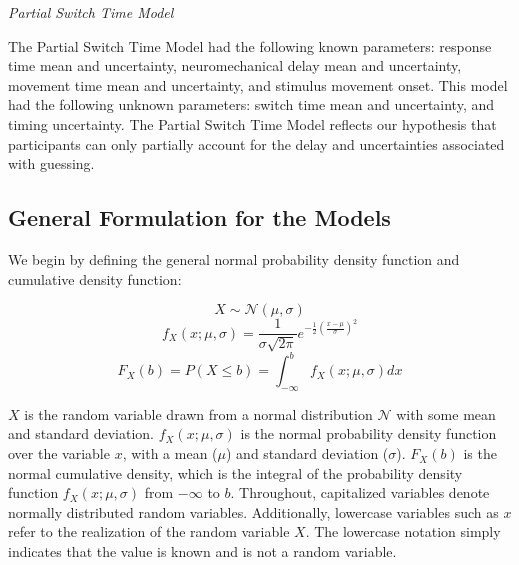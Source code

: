 \documentclass[12pt]{article}
\begin{document}
\vspace{2mm}
\noindent \emph{Partial Switch Time Model}

\noindent The Partial Switch Time Model had the following known parameters: response time mean and uncertainty, neuromechanical delay mean and uncertainty, movement time mean and uncertainty, and stimulus movement onset. This model had the following unknown parameters: switch time mean and uncertainty, and timing uncertainty. The Partial Switch Time Model reflects our hypothesis that participants can only partially account for the delay and uncertainties associated with guessing.

\vspace{2mm}
\subsection{General Formulation for the Models}

\noindent We begin by defining the general normal probability density function and cumulative density function:
\setlength{\belowdisplayskip}{4pt} \setlength{\belowdisplayshortskip}{4pt} %
\setlength{\abovedisplayskip}{4pt} \setlength{\abovedisplayshortskip}{4pt}

\setcounter{equation}{0}

\begin{equation}
    X\sim\mathcal{N}(\mu,\sigma)
\end{equation}
\begin{equation}
    f_{X}(x; \mu, \sigma) = \frac{1}{\sigma\sqrt{2\pi}}e^{-\frac{1}{2}(\frac{x-\mu}{\sigma})^2}
\end{equation}
\begin{equation}
    F_{X}(b) = P(X \leq b) = \int_{-\infty}^{b} f_{X}(x; \mu, \sigma)dx
\end{equation}

$X$ is the random variable drawn from a normal distribution $\mathcal{N}$ with some mean and standard deviation. $f_{X}(x;\mu,\sigma)$ is the normal probability density function over the variable $x$, with a mean ($\mu$) and standard deviation ($\sigma$). $F_{X}(b)$ is the normal cumulative density, which is the integral of the probability density function $f_{X}(x;\mu,\sigma)$ from $-\infty$ to $b$. Throughout, capitalized variables denote normally distributed random variables. Additionally, lowercase variables such as $x$ refer to the realization of the random variable $X$. The lowercase notation simply indicates that the value is known and is not a random variable.
\end{document}
